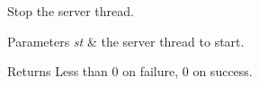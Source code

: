 \-Stop the server thread. 


\begin{DoxyParams}{\-Parameters}
{\em st} & the server thread to start. \\
\hline
\end{DoxyParams}
\begin{DoxyReturn}{\-Returns}
\-Less than 0 on failure, 0 on success. 
\end{DoxyReturn}
